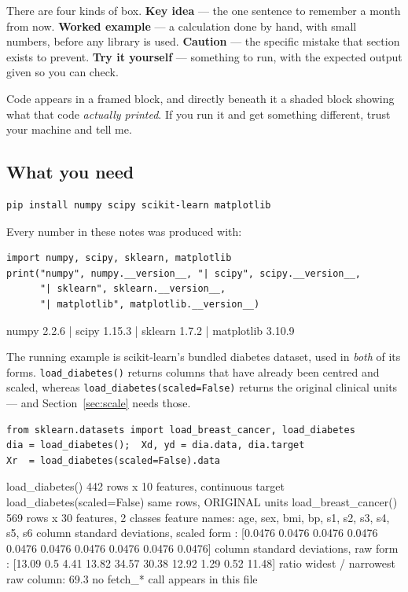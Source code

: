 \documentclass[11pt]{article}
\begin{document}
There are four kinds of box. \textbf{Key idea} --- the one sentence to
remember a month from now. \textbf{Worked example} --- a calculation done by
hand, with small numbers, before any library is used. \textbf{Caution} --- the
specific mistake that section exists to prevent. \textbf{Try it yourself} ---
something to run, with the expected output given so you can check.

Code appears in a framed block, and directly beneath it a shaded block showing
what that code \emph{actually printed}. If you run it and get something
different, trust your machine and tell me.

\subsection{What you need}

\begin{lstlisting}
pip install numpy scipy scikit-learn matplotlib
\end{lstlisting}

Every number in these notes was produced with:

\begin{lstlisting}
import numpy, scipy, sklearn, matplotlib
print("numpy", numpy.__version__, "| scipy", scipy.__version__,
      "| sklearn", sklearn.__version__,
      "| matplotlib", matplotlib.__version__)
\end{lstlisting}
\begin{codeout}
numpy 2.2.6 | scipy 1.15.3 | sklearn 1.7.2 | matplotlib 3.10.9
\end{codeout}

\begin{sloppypar}
The running example is scikit-learn's bundled diabetes dataset, used in
\emph{both} of its forms. \texttt{load\_diabetes()} returns columns that have
already been centred and scaled, whereas
\texttt{load\_diabetes(scaled=False)} returns the original clinical units ---
and Section~\ref{sec:scale} needs those.
\end{sloppypar}

\begin{lstlisting}
from sklearn.datasets import load_breast_cancer, load_diabetes
dia = load_diabetes();  Xd, yd = dia.data, dia.target
Xr  = load_diabetes(scaled=False).data
\end{lstlisting}
\begin{codeout}
load_diabetes()              442 rows x 10 features, continuous target
load_diabetes(scaled=False)  same rows, ORIGINAL units
load_breast_cancer()         569 rows x 30 features, 2 classes
feature names: age, sex, bmi, bp, s1, s2, s3, s4, s5, s6
column standard deviations, scaled form : [0.0476 0.0476 0.0476 0.0476 0.0476 0.0476 0.0476 0.0476 0.0476 0.0476]
column standard deviations, raw form    : [13.09  0.5   4.41 13.82 34.57 30.38 12.92  1.29  0.52 11.48]
ratio widest / narrowest raw column: 69.3
no fetch_* call appears in this file
\end{codeout}
\end{document}
